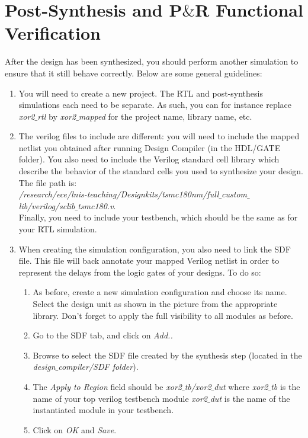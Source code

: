 \section{Post-Synthesis and P$\&$R Functional Verification}
After the design has been synthesized, you should perform another simulation to ensure that it still behave correctly. Below are some general guidelines:
	\begin{enumerate}
		\item You will need to create a new project. The RTL and post-synthesis simulations each need to be separate. As such, you can for instance replace \textit{xor2$\_$rtl} by \textit{xor2$\_$mapped} for the project name, library name, etc.
		\item The verilog files to include are different: you will need to include the mapped netlist you obtained after running Design Compiler (in the HDL/GATE folder). You also need to include the Verilog standard cell library which describe the behavior of the standard cells you used to synthesize your design. The file path is: \\
		\textit{/research/ece/lnis-teaching/Designkits/tsmc180nm/full$\_$custom$\_$lib/verilog/sclib$\_$tsmc180.v}. \\ Finally, you need to include your testbench, which should be the same as for your RTL simulation.
		\item When creating the simulation configuration, you also need to link the SDF file. This file will back annotate your mapped Verilog netlist in order to represent the delays from the logic gates of your designs. To do so:
			\begin{enumerate}
				\item As before, create a new simulation configuration and choose its name. Select the design unit as shown in the picture from the appropriate library. Don't forget to apply the full visibility to all modules as before.
				\item Go to the SDF tab, and click on \textit{Add..}
				\item Browse to select the SDF file created by the synthesis step (located in the \textit{design$\_$compiler/SDF folder}).
				\item The \textit{Apply to Region} field should be \textit{xor2$\_$tb/xor2$\_$dut} where \textit{xor2$\_$tb} is the name of your top verilog testbench module \textit{xor2$\_$dut} is the name of the instantiated module in your testbench.
				\item Click on \textit{OK} and \textit{Save}.

\end{enumerate}
\end{enumerate}

